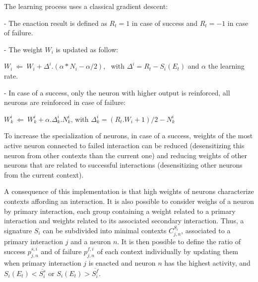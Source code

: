 \documentclass[conference]{IEEEtran}
\begin{document}
The learning process uses a classical gradient descent:


- The enaction result is defined as $R_t=1$ in case of success and $R_t=-1$ in case of failure.

- The weight $W_i$ is updated as follow:

$W_i ~\Leftarrow~ W_i+ \Delta^i . (\alpha * N_i - \alpha /2)$, ~with $\Delta^i=R_t-S_i(E_t)$
and $\alpha$ the learning rate.

- In case of a success, only the neuron with higher output is reinforced, all neurons are reinforced in case of failure:

$W_k^i ~\Leftarrow~ W_k^i+ \alpha . \Delta_k^i . N_k^i$,
with $\Delta_k^i=(R_t.W_i + 1)/2 - N_k^i$


To increase the specialization of neurons, in case of a success, weights of the most active neuron connected to failed interaction can be reduced (desensitizing this neuron from other contexts than the current one) and reducing weights of other neurons that are related to successful interactions (desensitizing other neurons from the current context).


A consequence of this implementation is that high weights of neurons characterize contexts affording an interaction. It is also possible to consider weighs of a neuron by primary interaction, each group containing a weight related to a primary interaction and weights related to its associated secondary interaction. Thus, a signature $S_i$ can be subdivided into minimal contexts $C_{j,n}^{S_i}$, associated to a primary interaction $j$ and a neuron $n$. It is then possible to define the ratio of success $p_{j,n}^{s,i}$ and of failure $p_{j,n}^{f,i}$ of each context individually by updating them when primary interaction $j$ is enacted and neuron $n$ has the highest activity, and $S_i(E_t)<\overline{S_i^s}$ or $S_i(E_t)>\overline{S_i^f}$.
\end{document}
